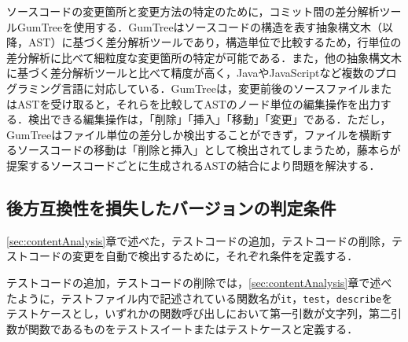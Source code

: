 \documentclass[submit]{ipsj}
\begin{document}
ソースコードの変更箇所と変更方法の特定のために，コミット間の差分解析ツールGumTree\cite{gumtree}を使用する．GumTreeはソースコードの構造を表す抽象構文木（以降，AST）に基づく差分解析ツールであり，構造単位で比較するため，行単位の差分解析に比べて細粒度な変更箇所の特定が可能である．また，他の抽象構文木に基づく差分解析ツール\cite{diff-1}\cite{diff-2}\cite{diff-3}と比べて精度が高く，JavaやJavaScriptなど複数のプログラミング言語に対応している．GumTreeは，変更前後のソースファイルまたはASTを受け取ると，それらを比較してASTのノード単位の編集操作を出力する．検出できる編集操作は，「削除」「挿入」「移動」「変更」である．ただし，GumTreeはファイル単位の差分しか検出することができず，ファイルを横断するソースコードの移動は「削除と挿入」として検出されてしまうため，藤本ら\cite{gumtreenoyatu}が提案するソースコードごとに生成されるASTの結合により問題を解決する．




\subsection{後方互換性を損失したバージョンの判定条件}\label{subsec:rq2.jouken}
\ref{sec:contentAnalysis}章で述べた，テストコードの追加，テストコードの削除，テストコードの変更を自動で検出するために，それぞれ条件を定義する．

テストコードの追加，テストコードの削除では，\ref{sec:contentAnalysis}章で述べたように，テストファイル内で記述されている関数名が{\verb|it|}，{\verb|test|}，{\verb|describe|}をテストケースとし，いずれかの関数呼び出しにおいて第一引数が文字列，第二引数が関数であるものをテストスイートまたはテストケースと定義する．

\end{document}
